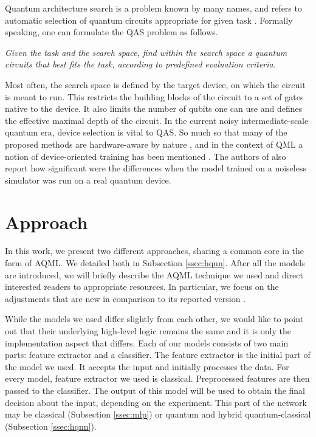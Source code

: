 \documentclass[runningheads]{llncs}
\begin{document}
Quantum architecture search is a problem known by many names, and refers to automatic selection of quantum circuits
appropriate for given task \cite{QAS}. Formally speaking, one can formulate the QAS problem as follows.
\begin{center}
	\textit{Given the task and the search space, find within the search space a quantum circuits that best fits the task,
		according to predefined evaluation criteria.}
\end{center}
Most often, the search space is defined by the target device, on which the circuit is meant to run. This restricts
the building blocks of the circuit to a set of gates native to the device. It also limits the number of qubits
one can use and defines the effective maximal depth of the circuit. In the current noisy intermediate-scale
quantum era, device selection is vital to QAS. So much so that many of the proposed methods are hardware-aware
by nature \cite{QAS}, and in the context of QML a notion of device-oriented training has been mentioned
\cite{QMLCaseStudy}. The authors of \cite{QMLCaseStudy} also report how significant were the differences when the
model trained on a noiseless simulator was run on a real quantum device.


\section{Approach}
\label{sec:method}

In this work, we present two different approaches, sharing a common core in the form of AQML. We detailed both in
Subsection \ref{ssec:hqnn}. After all the models are introduced, we will briefly describe the AQML technique we used
and direct interested readers to appropriate resources. In particular, we focus on the adjustments that are new in
comparison to its reported version \cite{Rybotycki_2025}.

While the models we used differ slightly from each other, we would like to point out that their underlying
high-level logic remains the same and it is only the implementation aspect that differs. Each of our models
consists of two main parts: feature extractor and a classifier. The feature extractor is the initial part of
the model we used. It accepts the input and initially processes the data. For every model, feature extractor
we used is classical. Preprocessed features are then passed to the classifier. The output of this
model will be used to obtain the final decision about the input, depending on the experiment. This part of the
network may be classical (Subsection \ref{ssec:mlp}) or quantum and hybrid quantum-classical (Subsection
\ref{ssec:hqnn}).
\end{document}
